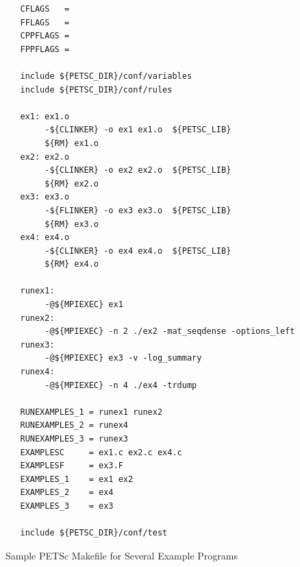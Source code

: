 {{{\begin{figure}[H]
{\small
\begin{verbatim}
   CFLAGS   = 
   FFLAGS   = 
   CPPFLAGS =
   FPPFLAGS =

   include ${PETSC_DIR}/conf/variables
   include ${PETSC_DIR}/conf/rules

   ex1: ex1.o 
        -${CLINKER} -o ex1 ex1.o  ${PETSC_LIB}
        ${RM} ex1.o
   ex2: ex2.o 
        -${CLINKER} -o ex2 ex2.o  ${PETSC_LIB}
        ${RM} ex2.o
   ex3: ex3.o 
        -${FLINKER} -o ex3 ex3.o  ${PETSC_LIB}
        ${RM} ex3.o
   ex4: ex4.o 
        -${CLINKER} -o ex4 ex4.o  ${PETSC_LIB}
        ${RM} ex4.o

   runex1:
        -@${MPIEXEC} ex1
   runex2:
        -@${MPIEXEC} -n 2 ./ex2 -mat_seqdense -options_left
   runex3:
        -@${MPIEXEC} ex3 -v -log_summary
   runex4:
        -@${MPIEXEC} -n 4 ./ex4 -trdump

   RUNEXAMPLES_1 = runex1 runex2
   RUNEXAMPLES_2 = runex4
   RUNEXAMPLES_3 = runex3
   EXAMPLESC     = ex1.c ex2.c ex4.c
   EXAMPLESF     = ex3.F
   EXAMPLES_1    = ex1 ex2
   EXAMPLES_2    = ex4
   EXAMPLES_3    = ex3

   include ${PETSC_DIR}/conf/test
\end{verbatim}
}
\caption{Sample PETSc Makefile for Several Example Programs}
\label{fig_make2}
\end{figure}

}}}
